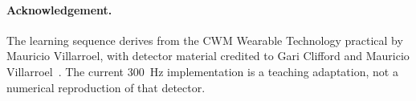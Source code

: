 \documentclass[12pt,article,oneside,linkcolour=blue]{oxengthesis}
\begin{document}
\paragraph{Acknowledgement.} The learning sequence derives from the CWM Wearable Technology
practical by Mauricio Villarroel, with detector material credited to Gari Clifford and Mauricio
Villarroel~\cite{villarroel_cwm}. The current \SI{300}{\hertz} implementation is a teaching
adaptation, not a numerical reproduction of that detector.


\backmatter
\listofreferences
\end{document}
